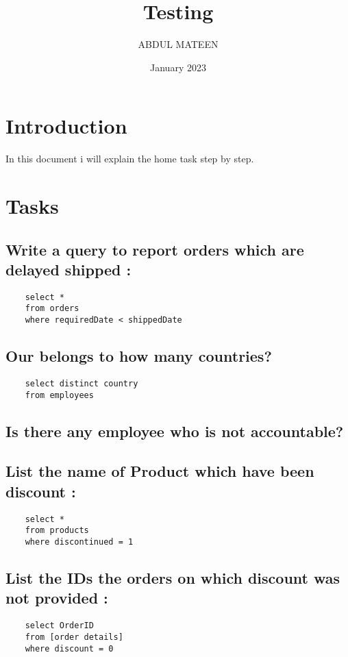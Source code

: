\documentclass{article}
\title{Testing}
\author{ABDUL MATEEN}
\date{January 2023}
\begin{document}
\maketitle

\section{Introduction}
\indent \indent  In this document i will explain the home task step by step.

\section{Tasks}

\subsection{Write a query to report orders which are delayed shipped :}
\begin{lstlisting}
    select * 
    from orders
    where requiredDate < shippedDate
\end{lstlisting}

\subsection{Our belongs to how many countries?}
\begin{lstlisting}
    select distinct country
    from employees
\end{lstlisting}

\subsection{Is there any employee who is not accountable?}


\subsection{List the name of Product which have been discount :}
\begin{lstlisting}
    select *
    from products
    where discontinued = 1
\end{lstlisting}

\subsection{ List the IDs the orders on which discount was not provided :}
\begin{lstlisting}
    select OrderID
    from [order details]
    where discount = 0
\end{lstlisting}
\end{document}
